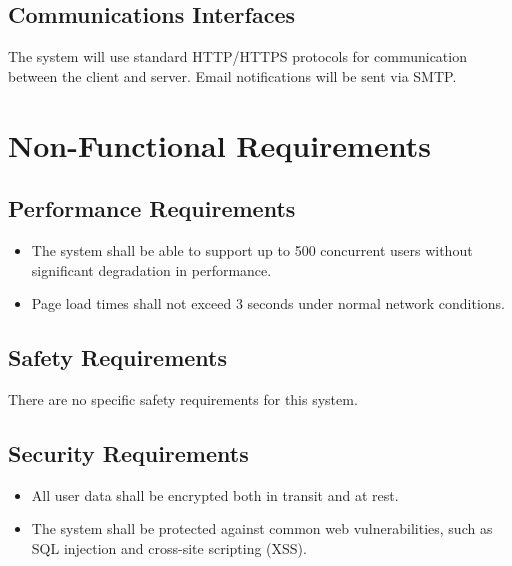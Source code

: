 \documentclass[11pt, a4paper]{article}
\begin{document}
\subsection{Communications Interfaces}
\label{sec:comm_interfaces}
The system will use standard HTTP/HTTPS protocols for communication between the client and server. Email notifications will be sent via SMTP.

\section{Non-Functional Requirements}
\label{sec:non_functional}

\subsection{Performance Requirements}
\label{sec:performance}
\begin{itemize}
    \item The system shall be able to support up to 500 concurrent users without significant degradation in performance.
    \item Page load times shall not exceed 3 seconds under normal network conditions.
\end{itemize}

\subsection{Safety Requirements}
\label{sec:safety}
There are no specific safety requirements for this system.

\subsection{Security Requirements}
\label{sec:security}
\begin{itemize}
    \item All user data shall be encrypted both in transit and at rest.
    \item The system shall be protected against common web vulnerabilities, such as SQL injection and cross-site scripting (XSS).
\end{itemize}
\end{document}

